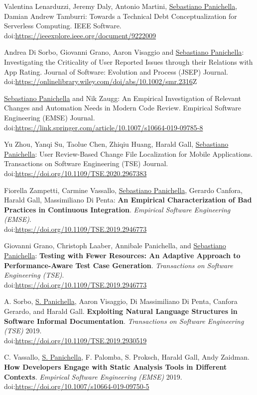 \documentclass[10pt]{article}
\newcommand\doilink[1]{\href{http://dx.doi.org/#1}{#1}}
\newcommand\doi[1]{doi:\doilink{#1}}
\begin{document}
\begin{bibenum}
\item \label{J10}   Valentina Lenarduzzi, Jeremy Daly, Antonio Martini, \underline{Sebastiano Panichella}, Damian Andrew Tamburri: Towards a Technical Debt Conceptualization for Serverless Computing.   IEEE Software.   \\ \doi{https://ieeexplore.ieee.org/document/9222009} 
\item \label{J09}  Andrea Di Sorbo, Giovanni Grano, Aaron Visaggio and \underline{Sebastiano Panichella}:  Investigating the Criticality of User Reported Issues through their Relations with App Rating.   Journal of Software: Evolution and Process (JSEP) Journal. \\ \doi{https://onlinelibrary.wiley.com/doi/abs/10.1002/smr.2316}Z
\item \label{J08}  \underline{Sebastiano Panichella} and Nik Zaugg:  An Empirical Investigation of Relevant Changes and Automation Needs in Modern Code Review.   Empirical Software Engineering (EMSE) Journal. \\ \doi{https://link.springer.com/article/10.1007/s10664-019-09785-8} 
\item \label{J07} Yu Zhou, Yanqi Su, Taolue Chen, Zhiqiu Huang, Harald Gall, \underline{Sebastiano Panichella}:  User Review-Based Change File Localization for Mobile Applications.  Transactions on Software Engineering (TSE) Journal. \\ \doi{https://doi.org/10.1109/TSE.2020.2967383} 
\item \label{J06} Fiorella Zampetti, Carmine Vassallo, \underline{Sebastiano Panichella}, Gerardo Canfora, Harald Gall, Massimiliano Di Penta:  \textbf{An Empirical Characterization of Bad Practices in Continuous Integration}.  \emph{Empirical Software Engineering (EMSE)}. \\ \doi{https://doi.org/10.1109/TSE.2019.2946773}
\item \label{J05} Giovanni Grano, Christoph Laaber, Annibale Panichella, and \underline{Sebastiano Panichella}:  \textbf{Testing with Fewer Resources: An Adaptive Approach to Performance-Aware Test Case Generation}.  \emph{Transactions on Software Engineering (TSE)}.  \\ \doi{https://doi.org/10.1109/TSE.2019.2946773}\\
\item \label{J04} A. Sorbo, \underline{S. Panichella},  Aaron Visaggio, Di Massimiliano Di Penta, Canfora Gerardo, and Harald Gall. \textbf{Exploiting Natural Language Structures in Software Informal Documentation}. \emph{Transactions on Software Engineering (TSE)} 2019. \\ \doi{https://doi.org/10.1109/TSE.2019.2930519}\\
\item \label{J03} C. Vassallo, \underline{S. Panichella}, F. Palomba, S. Proksch, Harald Gall, Andy Zaidman. \textbf{How Developers Engage with Static Analysis Tools in Different Contexts}. \emph{Empirical Software Engineering (EMSE)} 2019.\\ \doi{https://doi.org/10.1007/s10664-019-09750-5}\\
    

\end{bibenum}
\end{document}
